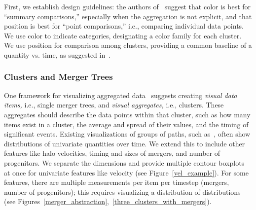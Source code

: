 First, we establish design guidelines: the authors of~\cite{Albers:2014:TEA:2556288.2557200} suggest that color is best for ``summary comparisons,'' especially when the aggregation is not explicit, and that position is best for ``point comparisons,'' i.e., comparing individual data points. We use color to indicate categories, designating a color family for each cluster. We use position for comparison among clusters, providing a common baseline of a quantity vs. time, as suggested in~\cite{graphical_perception}.


\subsubsection{Clusters and Merger Trees}
One framework for visualizing aggregated data~\cite{elmqvist2010} suggests creating \textit{visual data items,} i.e., single merger trees, and \textit{visual aggregates,} i.e., clusters. These aggregates should describe the data points within that cluster, such as how many items exist in a cluster, the average and spread of their values, and the timing of significant events. Existing visualizations of groups of paths, such as~\cite{contour_boxplot}, often show distributions of univariate quantities over time. We extend this to include other features like halo velocities, timing and sizes of mergers, and number of progenitors. We separate the dimensions and provide multiple contour boxplots at once for univariate features like velocity (see Figure~\ref{vel_example}). For some features, there are multiple measurements per item per timestep (mergers, number of progenitors); this requires visualizing a distribution of distributions (see Figures~\ref{merger_abstraction},~\ref{three_clusters_with_mergers}).



